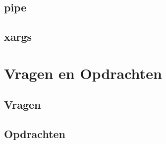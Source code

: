 \documentclass[a4paper,12pt,twoside,openright,titlepage]{article}
\begin{document}
\subsection{pipe}

\subsection{xargs}


\section{Vragen en Opdrachten}
\subsection{Vragen}

\subsection{Opdrachten}


\printindex
\end{document}
